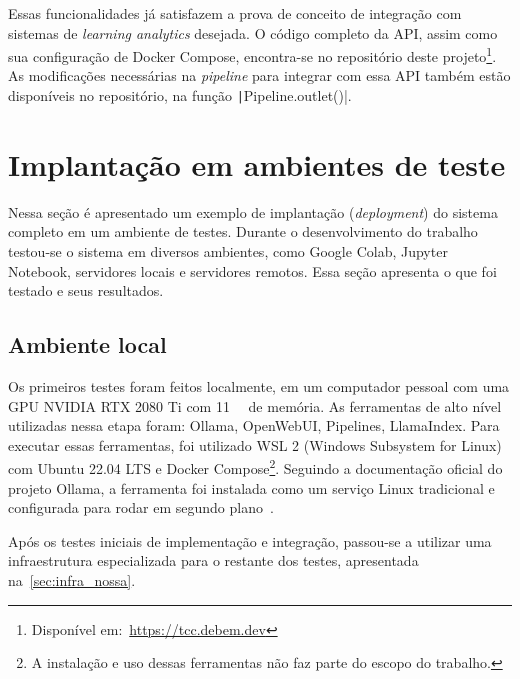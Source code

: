 \documentclass[journal]{IEEEtran}
\begin{document}
Essas funcionalidades já satisfazem a prova de conceito de integração com sistemas de \textit{learning analytics} desejada.
O código completo da API, assim como sua configuração de Docker Compose, encontra-se no repositório deste projeto\footnote{Disponível em:~\url{https://tcc.debem.dev}}.
As modificações necessárias na \textit{pipeline} para integrar com essa API também estão disponíveis no repositório, na função \texttt|Pipeline.outlet()|.

\section{Implantação em ambientes de teste\label{sec:deploy_test}}

\noindent%
Nessa seção é apresentado um exemplo de implantação (\textit{deployment}) do sistema completo em um ambiente de testes.
Durante o desenvolvimento do trabalho testou-se o sistema em diversos ambientes, como Google Colab, Jupyter Notebook, servidores locais e servidores remotos.
Essa seção apresenta o que foi testado e seus resultados.

\subsection{Ambiente local\label{sec:deploy_test_local}}

\noindent%
Os primeiros testes foram feitos localmente, em um computador pessoal com uma GPU NVIDIA RTX 2080 Ti com \SI{11}{\giga\byte} de memória.
As ferramentas de alto nível utilizadas nessa etapa foram: Ollama, OpenWebUI, Pipelines, LlamaIndex.
Para executar essas ferramentas, foi utilizado WSL 2 (Windows Subsystem for Linux) com Ubuntu 22.04 LTS e Docker Compose\footnote{%
A instalação e uso dessas ferramentas não faz parte do escopo do trabalho.}.
Seguindo a documentação oficial do projeto Ollama, a ferramenta foi instalada como um serviço Linux tradicional e configurada para rodar em segundo plano~\cite{ollama}.

Após os testes iniciais de implementação e integração, passou-se a utilizar uma infraestrutura especializada para o restante dos testes, apresentada na~\cref{sec:infra_nossa}.
\end{document}
